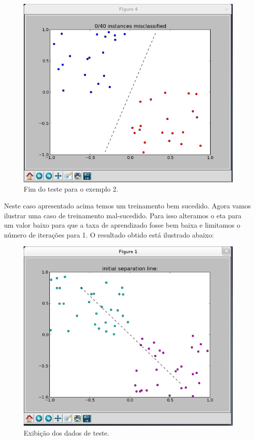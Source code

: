 \documentclass[brazil, a4paper]{article}
\begin{document}
\begin{itemize}
\begin{figure}[!htb]
\centering
\includegraphics[scale=0.25]{ex2-t3.png}
\caption{Fim do teste para o exemplo 2.}
\end{figure}

Neste caso apresentado acima temos um treinamento bem sucedido. Agora vamos ilustrar uma caso de treinamento mal-sucedido. Para isso alteramos o eta para um valor baixo para que a taxa de aprendizado fosse bem baixa e limitamos o número de iterações para 1. O resultado obtido está ilustrado abaixo: 

\newpage

\begin{figure}[!htb]
\centering
\includegraphics[scale=0.25]{ex3-1.png}
\caption{Exibição dos dados de teste.}
\end{figure}


\end{itemize}
\end{document}
